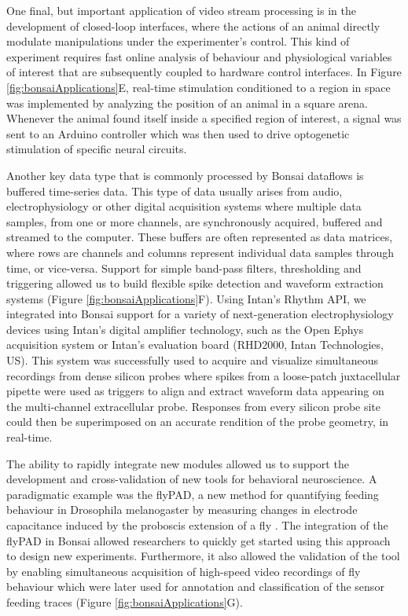 One final, but important application of video stream processing is in the development of closed-loop interfaces, where the actions of an animal directly modulate manipulations under the experimenter's control. This kind of experiment requires fast online analysis of behaviour and physiological variables of interest that are subsequently coupled to hardware control interfaces. In Figure \ref{fig:bonsaiApplications}E, real-time stimulation conditioned to a region in space was implemented by analyzing the position of an animal in a square arena. Whenever the animal found itself inside a specified region of interest, a signal was sent to an Arduino controller which was then used to drive optogenetic stimulation of specific neural circuits.

Another key data type that is commonly processed by Bonsai dataflows is buffered time-series data. This type of data usually arises from audio, electrophysiology or other digital acquisition systems where multiple data samples, from one or more channels, are synchronously acquired, buffered and streamed to the computer. These buffers are often represented as data matrices, where rows are channels and columns represent individual data samples through time, or vice-versa. Support for simple band-pass filters, thresholding and triggering allowed us to build flexible spike detection and waveform extraction systems (Figure \ref{fig:bonsaiApplications}F). Using Intan's Rhythm API, we integrated into Bonsai support for a variety of next-generation electrophysiology devices using Intan's digital amplifier technology, such as the Open Ephys acquisition system \cite{Voigts2013} or Intan's evaluation board (RHD2000, Intan Technologies, US). This system was successfully used to acquire and visualize simultaneous recordings from dense silicon probes where spikes from a loose-patch juxtacellular pipette were used as triggers to align and extract waveform data appearing on the multi-channel extracellular probe. Responses from every silicon probe site could then be superimposed on an accurate rendition of the probe geometry, in real-time.

The ability to rapidly integrate new modules allowed us to support the development and cross-validation of new tools for behavioral neuroscience. A paradigmatic example was the flyPAD, a new method for quantifying feeding behaviour in Drosophila melanogaster by measuring changes in electrode capacitance induced by the proboscis extension of a fly \cite{Itskov2014}. The integration of the flyPAD in Bonsai allowed researchers to quickly get started using this approach to design new experiments. Furthermore, it also allowed the validation of the tool by enabling simultaneous acquisition of high-speed video recordings of fly behaviour which were later used for annotation and classification of the sensor feeding traces (Figure \ref{fig:bonsaiApplications}G).

